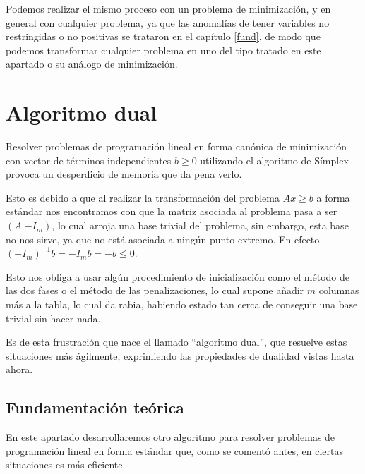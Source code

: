   Podemos realizar el mismo proceso con un problema de minimización, y en general con cualquier problema, ya que las anomalías de tener variables no restringidas o no positivas se trataron en el capítulo \ref{fund}, de modo que podemos transformar cualquier problema en uno del tipo tratado en este apartado o su análogo de minimización.
\section{Algoritmo dual}
Resolver problemas de programación lineal en forma canónica de minimización con vector de términos independientes $b\geq 0$ utilizando el algoritmo de Símplex provoca un desperdicio de memoria que da pena verlo.

Esto es debido a que al realizar la transformación del problema $Ax\geq b$ a forma estándar nos encontramos con que la matriz asociada al problema pasa a ser $(A|-I_m)$, lo cual arroja una base trivial del problema, sin embargo, esta base no nos sirve, ya que no está asociada a ningún punto extremo. En efecto $(-I_m)^{-1}b=-I_mb=-b\leq 0$.

Esto nos obliga a usar algún procedimiento de inicialización como el método de las dos fases o el método de las penalizaciones, lo cual supone añadir $m$ columnas más a la tabla, lo cual da rabia, habiendo estado tan cerca de conseguir una base trivial sin hacer nada.

Es de esta frustración que nace el llamado ``algoritmo dual'', que resuelve estas situaciones más ágilmente, exprimiendo las propiedades de dualidad vistas hasta ahora.
\subsection{Fundamentación teórica}
En este apartado desarrollaremos otro algoritmo para resolver problemas de programación lineal en forma estándar que, como se comentó antes, en ciertas situaciones es más eficiente.


